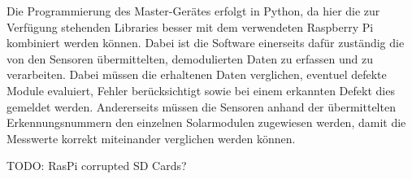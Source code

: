 Die  Programmierung  des  Master-Ger\"ates  erfolgt in  Python,  da  hier  die
zur  Verf\"ugung  stehenden Libraries  besser  mit  dem verwendeten  Raspberry
Pi  kombiniert  werden k\"onnen. Dabei  ist  die  Software einerseits  daf\"ur
zust\"andig  die  von den  Sensoren  \"ubermittelten,  demodulierten Daten  zu
erfassen und  zu verarbeiten. Dabei m\"ussen die  erhaltenen Daten verglichen,
eventuel  defekte Module  evaluiert, Fehler  ber\"ucksichtigt sowie  bei einem
erkannten  Defekt dies  gemeldet  werden. Andererseits  m\"ussen die  Sensoren
anhand  der  \"ubermittelten   Erkennungsnummern  den  einzelnen  Solarmodulen
zugewiesen werden,  damit die Messwerte korrekt  miteinander verglichen werden
k\"onnen.

\textsc{TODO}: RasPi corrupted SD Cards?
